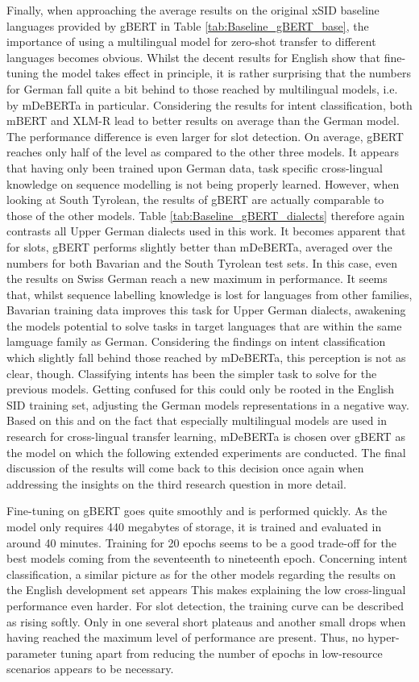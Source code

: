 \documentclass[11pt,a4paper,twoside,openright]{scrbook}
\begin{document}
Finally, when approaching the average results on the original xSID baseline languages provided by gBERT \citep{chan-etal-2020-germans} in Table \ref{tab:Baseline_gBERT_base}, the importance of using a multilingual model for zero-shot transfer to different languages becomes obvious. Whilst the decent results for English show that fine-tuning the model takes effect in principle, it is rather surprising that the numbers for German fall quite a bit behind to those reached by multilingual models, i.e. by mDeBERTa in particular. Considering the results for intent classification, both mBERT and XLM-R lead to better results on average than the German model. The performance difference is even larger for slot detection. On average, gBERT reaches only half of the level as compared to the other three models. It appears that having only been trained upon German data, task specific cross-lingual knowledge on sequence modelling is not being properly learned. However, when looking at South Tyrolean, the results of gBERT are actually comparable to those of the other models. Table \ref{tab:Baseline_gBERT_dialects} therefore again contrasts all Upper German dialects used in this work. It becomes apparent that for slots, gBERT performs slightly better than mDeBERTa, averaged over the numbers for both Bavarian and the South Tyrolean test sets. In this case, even the results on Swiss German reach a new maximum in performance. It seems that, whilst sequence labelling knowledge is lost for languages from other families, Bavarian training data improves this task for Upper German dialects, awakening the models potential to solve tasks in target languages that are within the same lamguage family as German. Considering the findings on intent classification which slightly fall behind those reached by mDeBERTa, this perception is not as clear, though. Classifying intents has been the simpler task to solve for the previous models. Getting confused for this could only be rooted in the English SID training set, adjusting the German models representations in a negative way. Based on this and on the fact that especially multilingual models are used in research for cross-lingual transfer learning, mDeBERTa is chosen over gBERT as the model on which the following extended experiments are conducted. The final discussion of the results will come back to this decision once again when addressing the insights on the third research question in more detail.

Fine-tuning on gBERT goes quite smoothly and is performed quickly. As the model only requires 440 megabytes of storage, it is trained and evaluated in around 40 minutes. Training for 20 epochs seems to be a good trade-off for the best models coming from the seventeenth to nineteenth epoch. Concerning intent classification, a similar picture as for the other models regarding the results on the English development set appears This makes explaining the low cross-lingual performance even harder. For slot detection, the training curve can be described as rising softly. Only in one several short plateaus and another small drops when having reached the maximum level of performance are present. Thus, no hyper-parameter tuning apart from reducing the number of epochs in low-resource scenarios appears to be necessary.
\end{document}
